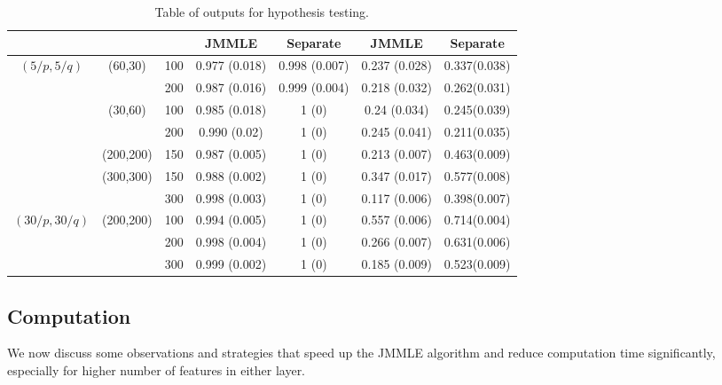\begin{scriptsize}
\begin{table}
\begin{tabular}{ccccccc}
 & & & JMMLE     & Separate			   & JMMLE         & Separate           \\ \hline
    $(5/p, 5/q)$ & (60,30)   & 100 & 0.977 (0.018) & 0.998 (0.007) & 0.237 (0.028) & 0.337(0.038) \\
    ~            & ~         & 200 & 0.987 (0.016) & 0.999 (0.004) & 0.218 (0.032) & 0.262(0.031) \\
    ~            & (30,60)   & 100 & 0.985 (0.018) & 1 (0)         & 0.24 (0.034)  & 0.245(0.039) \\
    ~            & ~         & 200 & 0.990 (0.02)  & 1 (0)         & 0.245 (0.041) & 0.211(0.035) \\
    ~            & (200,200) & 150 & 0.987 (0.005) & 1 (0)         & 0.213 (0.007) & 0.463(0.009) \\
    ~            & (300,300) & 150 & 0.988 (0.002) & 1 (0)         & 0.347 (0.017) & 0.577(0.008) \\
    ~            & ~         & 300 & 0.998 (0.003) & 1 (0)         & 0.117 (0.006) & 0.398(0.007) \\ \hline
  $(30/p, 30/q)$ & (200,200) & 100 & 0.994 (0.005) & 1 (0)         & 0.557 (0.006) & 0.714(0.004) \\
    ~            & ~         & 200 & 0.998 (0.004) & 1 (0)         & 0.266 (0.007) & 0.631(0.006) \\
    ~            & ~         & 300 & 0.999 (0.002) & 1 (0)         & 0.185 (0.009) & 0.523(0.009) \\ 
\hline    
\end{tabular}
    \caption{Table of outputs for hypothesis testing.}
    \label{table:simtable3}
\end{table}
\end{scriptsize}

\subsection{Computation}
\label{sec:tricks-jmmle}
We now discuss some observations and strategies that speed up the JMMLE algorithm and reduce computation time significantly, especially for higher number of features in either layer.


